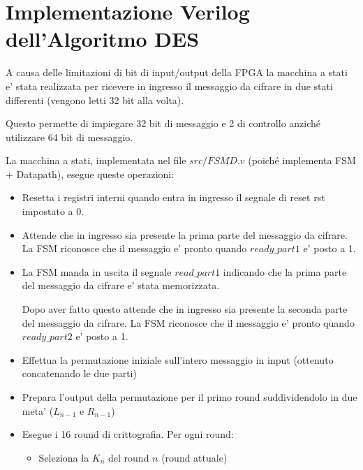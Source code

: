\documentclass[a4paper]{article}
\begin{document}
\section{Implementazione Verilog dell'Algoritmo DES}

A causa delle limitazioni di bit di input/output della FPGA la macchina a stati e' stata realizzata per ricevere in ingresso il messaggio da cifrare in due stati differenti (vengono letti 32 bit alla volta).

Questo permette di impiegare 32 bit di messaggio e 2 di controllo anziché utilizzare 64 bit di messaggio.

La macchina a stati, implementata nel file $src/FSMD.v$ (poiché implementa FSM + Datapath), esegue queste operazioni:
\begin{itemize}
    \item Resetta i registri interni quando entra in ingresso il segnale di reset rst impostato a 0.
    

    \item Attende che in ingresso sia presente la prima parte del messaggio da cifrare. La FSM riconosce che il messaggio e' pronto quando $ready\_part1$ e' posto a 1.
    \item La FSM manda in uscita il segnale $read\_part1$ indicando che la prima parte del messaggio da cifrare e' stata memorizzata.
          
          Dopo aver fatto questo attende che in ingresso sia presente la seconda parte del messaggio da cifrare. La FSM riconosce che il messaggio e' pronto quando $ready\_part2$ e' posto a 1.
    
    \item Effettua la permutazione iniziale sull'intero messaggio in input (ottenuto concatenando le due parti)
          

    \item Prepara l'output della permutazione per il primo round suddividendolo in due meta' ($L_{n-1}$ e $R_{n-1}$)
    \item Esegue i 16 round di crittografia. Per ogni round:
        \begin{itemize}
            \item Seleziona la $K_n$ del round $n$ (round attuale)


\end{itemize}
\end{itemize}
\end{document}
